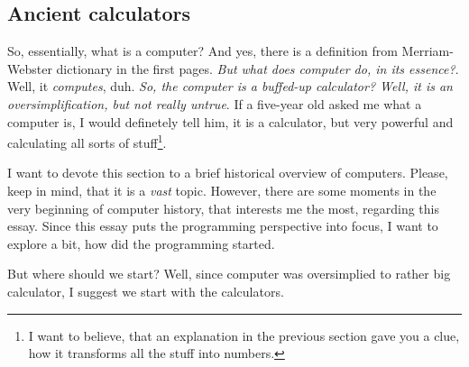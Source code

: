 \documentclass[../../what-is-computer]{subfiles}
\begin{document}
        
    \subsection{Ancient calculators}

    So, essentially, what is a computer? And yes, there is a definition from Merriam-Webster dictionary in the first pages. \emph{But what does computer do, in its essence?}.
    Well, it \emph{computes}, duh. \emph{So, the computer is a buffed-up calculator? Well, it is an oversimplification, but not really untrue}. If a five-year old asked me
    what a computer is, I would definetely tell him, it is a calculator, but very powerful and calculating all sorts of stuff\footnote{I want to believe, that an explanation in 
    the previous section gave you a clue, how it transforms all the stuff into numbers.}. \par

    I want to devote this section to a brief historical overview of computers. Please, keep in mind, that it is a \emph{vast} topic. However, there are some moments in the very
    beginning of computer history, that interests me the most, regarding this essay. Since this essay puts the programming perspective into focus, I want to explore 
    a bit, how did the programming started. \par

    But where should we start? Well, since computer was oversimplied to rather big calculator, I suggest we start with the calculators.\par
\end{document}
